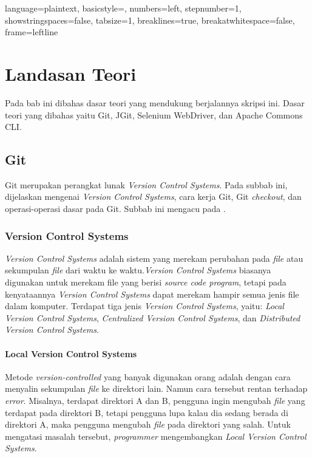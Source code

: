 

\lstset
{ 
    language=plaintext,
    basicstyle=\footnotesize,
    numbers=left,
    stepnumber=1,
    showstringspaces=false,
    tabsize=1,
    breaklines=true,
    breakatwhitespace=false,
    frame=leftline
}



\chapter{Landasan Teori}
\label{chap:teori}

Pada bab ini dibahas dasar teori yang mendukung berjalannya skripsi ini. Dasar teori yang dibahas yaitu Git, JGit, Selenium WebDriver, dan Apache Commons CLI.

\section{Git}
\label{sec:git} 
Git merupakan perangkat lunak \textit{Version Control Systems}. Pada subbab ini, dijelaskan mengenai \textit{Version Control Systems}, cara kerja Git, Git \textit{checkout}, dan operasi-operasi dasar pada Git. Subbab ini mengacu pada \cite{chacon2014pro}.   

\subsection{Version Control Systems}
\label{subsec:vcs}
\textit{Version Control Systems} adalah sistem yang merekam perubahan pada \textit{file} atau sekumpulan \textit{file} dari waktu ke waktu.\textit{Version Control Systems} biasanya digunakan  untuk merekam file yang berisi \textit{source code program}, tetapi pada kenyataannya \textit{Version Control Systems} dapat merekam hampir semua jenis file dalam komputer. Terdapat tiga jenis \textit{Version Control Systems}, yaitu: \textit{Local Version Control Systems}, \textit{Centralized Version Control Systems}, dan \textit{Distributed Version Control Systems}.

\subsubsection{Local Version Control Systems}
Metode \textit{version-controlled} yang banyak digunakan orang adalah dengan cara menyalin sekumpulan \textit{file} ke direktori lain. Namun cara tersebut rentan terhadap \textit{error}.
Misalnya, terdapat direktori A dan B, pengguna ingin mengubah \textit{file} yang terdapat pada direktori B, tetapi pengguna lupa kalau dia sedang berada di direktori A, maka pengguna mengubah \textit{file} pada direktori yang salah. Untuk mengatasi masalah tersebut, \textit{programmer} mengembangkan \textit{Local Version Control Systems}. 

